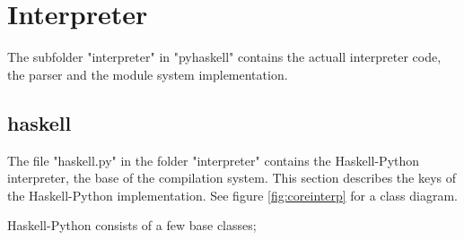 \section{Interpreter}

The subfolder "interpreter" in "pyhaskell" contains the actuall 
interpreter code, the parser and the module system implementation.

\subsection{haskell}

The file "haskell.py" in the folder "interpreter" contains the
Haskell-Python interpreter, the base of the compilation system.
This section describes the keys of the Haskell-Python implementation.
See figure \ref{fig:coreinterp} for a class diagram.

Haskell-Python consists of a few base classes; 

